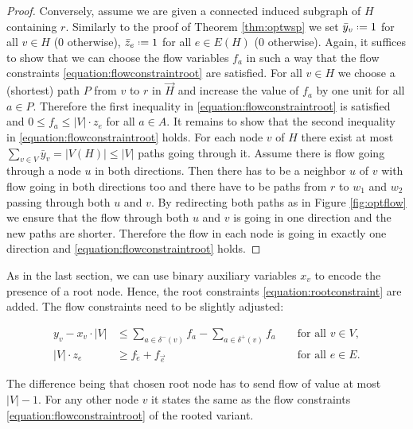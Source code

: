\begin{proof}
	Conversely, assume we are given a connected induced subgraph of $H$ containing $r$. Similarly to the proof of Theorem \ref{thm:optwsp} we set $\bar{y}_v \defeq 1$ for all $v \in H$ ($0$ otherwise), $\bar{z}_e \defeq 1$ for all $e \in E(H)$ ($0$ otherwise). Again, it suffices to show that we can choose the flow variables $f_a$ in such a way that the flow constraints \eqref{equation:flowconstraintroot} are satisfied. For all $v \in H$ we choose a (shortest) path $P$ from $v$ to $r$ in $\overrightarrow{H}$ and increase the value of $f_a$ by one unit for all $a \in P$. Therefore the first inequality in \eqref{equation:flowconstraintroot} is satisfied and $0 \leq f_a \leq |V| \cdot z_e$ for all $a \in A$. It remains to show that the second inequality in \eqref{equation:flowconstraintroot} holds. For each node $v$ of $H$ there exist at most $\sum_{v \in V} \bar{y}_v = |V(H)| \leq |V|$ paths going through it. Assume there is flow going through a node $u$ in both directions. Then there has to be a neighbor $u$ of $v$ with flow going in both directions too and there have to be paths from $r$ to $w_1$ and $w_2$ passing through both $u$ and $v$. By redirecting both paths as in Figure \ref{fig:optflow} we ensure that the flow through both $u$ and $v$ is going in one direction and the new paths are shorter. Therefore the flow in each node is going in exactly one direction and \eqref{equation:flowconstraintroot} holds.
\end{proof}

As in the last section, we can use binary auxiliary variables $x_v$ to encode the presence of a root node. Hence, the root constraints \eqref{equation:rootconstraint} are added. The flow constraints need to be slightly adjusted: 

\begin{equation}
	\label{equation:flowconstraint}
	\begin{aligned}
		y_v - x_v \cdot |V| &\leq \sum_{a \in \delta^-(v)} f_a - \sum_{a \in \delta^+(v)} f_a &&\text{ for all } v \in V,\\
		|V| \cdot z_e &\geq f_{\overleftarrow{e}} + f_{\overrightarrow{e}} &&\text{ for all } e \in E.
	\end{aligned}
\end{equation}

The difference being that chosen root node has to send flow of value at most $|V| - 1$. For any other node $v$ it states the same as the flow constraints \eqref{equation:flowconstraintroot} of the rooted variant.\medskip

